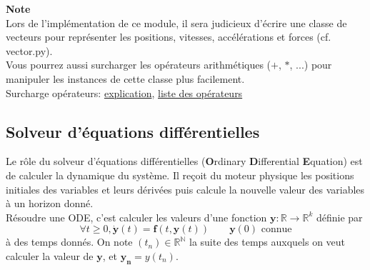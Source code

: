 \documentclass{article}
\newcommand{\myvec}[1]{\ensuremath{\mathbf{#1}}}
\begin{document}
\noindent\textbf{Note} \\
Lors de l'implémentation de ce module, il sera judicieux d'écrire une classe de vecteurs pour représenter les positions, vitesses, accélérations et forces (cf. vector.py). \\
Vous pourrez aussi surcharger les opérateurs arithmétiques ($+$, $*$, ...) pour manipuler les instances de cette classe plus facilement.\\
Surcharge opérateurs: \href{https://openclassrooms.com/fr/courses/235344-apprenez-a-programmer-en-python/233046-appliquez-des-methodes-speciales#/id/r-232928}{explication}, \href{https://docs.python.org/fr/3/library/operator.html}{liste des opérateurs}

\subsection{Solveur d'équations différentielles}
\label{solveur}

Le rôle du solveur d'équations différentielles (\textbf{O}rdinary \textbf{D}ifferential \textbf{E}quation) est de calculer la dynamique du système. Il reçoit du moteur physique les positions initiales des variables et leurs dérivées puis calcule la nouvelle valeur des variables à un horizon donné.\\
Résoudre une ODE, c'est calculer les valeurs d'une fonction $\myvec{y} : \mathbb{R} \rightarrow \mathbb{R}^k$ définie par
\begin{equation*}
\forall t \ge 0, \myvec{\dot{y}}(t) = \myvec{f}(t, \myvec{y}(t)) \quad\quad \myvec{y}(0) \text{ connue}
\end{equation*}
à des temps donnés. On note $(t_n) \in \mathbb{R}^\mathbb{N}$ la suite des temps auxquels on veut calculer la valeur de $\myvec{y}$, et $\myvec{y_n} = y(t_n)$.

\vspace{1em}
\end{document}
